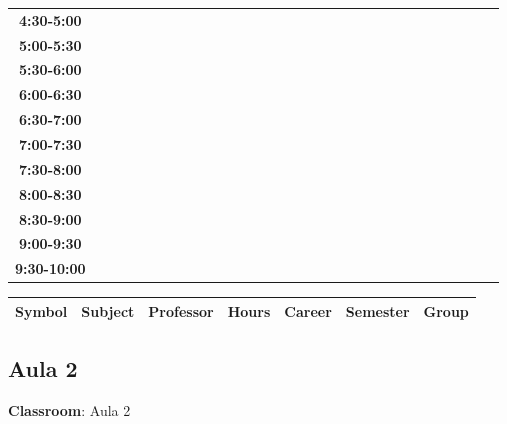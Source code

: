 \documentclass{article}
\begin{document}
\begin{table}[ht]
\begin{tabular}{|c|c|c|c|c|c|c|c|c|c|c|c|c|c|c|c|c|c|c|c|c|c|c|c|c|c|c|c|c|c|}
 \cline{1-8} 
\textbf{4:30-5:00} &   &   &   &   &   &   &   \\
 \cline{1-8} 
\textbf{5:00-5:30} &   &   &   &   &   &   &   \\
 \cline{1-8} 
\textbf{5:30-6:00} &   &   &   &   &   &   &   \\
 \cline{1-8} 
\textbf{6:00-6:30} &   &   &   &   &   &   &   \\
 \cline{1-8} 
\textbf{6:30-7:00} &   &   &   &   &   &   &   \\
 \cline{1-8} 
\textbf{7:00-7:30} &   &   &   &   &   &   &   \\
 \cline{1-8} 
\textbf{7:30-8:00} &   &   &   &   &   &   &   \\
 \cline{1-8} 
\textbf{8:00-8:30} &   &   &   &   &   &   &   \\
 \cline{1-8} 
\textbf{8:30-9:00} &   &   &   &   &   &   &   \\
 \cline{1-8} 
\textbf{9:00-9:30} &   &   &   &   &   &   &   \\
 \cline{1-8} 
\textbf{9:30-10:00} &   &   &   &   &   &   &   \\
 \cline{1-8} 
\end{tabular}\end{table}

        
        \begin{tabular}{|>{\centering\arraybackslash}m{2cm}|>{\centering\arraybackslash}m{4cm}|>{\centering\arraybackslash}m{2.15cm}|>{\centering\arraybackslash}m{1.8cm}|>{\centering\arraybackslash}m{2cm}|>{\centering\arraybackslash}m{2cm}|>{\centering\arraybackslash}m{2cm}|}
        \hline
        \textbf{Symbol} & \textbf{Subject} & \textbf{Professor} & \textbf{Hours} & \textbf{Career} & \textbf{Semester} & \textbf{Group} \\
        \hline
        \end{tabular}
                    

        \newpage
        

        \subsection{Aula 2}
        \vspace*{.1cm}
        
        \begin{flushright}
            {\LARGE \textbf{Classroom}: Aula 2}
        \end{flushright}
        \vspace{1cm}
\end{document}

